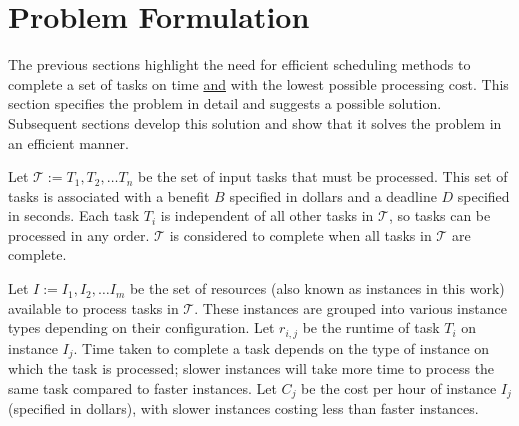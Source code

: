 \documentclass[12pt]{report}
\begin{document}

\section{Problem Formulation}

The previous sections highlight the need for efficient scheduling methods to complete a set of tasks on time \underline{and} with the lowest possible processing cost.
This section specifies the problem in detail and suggests a possible solution.
Subsequent sections develop this solution and show that it solves the problem in an efficient manner.

Let $\mathcal{T} := {T_1, T_2, \dots T_n}$ be the set of input tasks that must be processed.
This set of tasks is associated with a benefit $B$ specified in dollars and a deadline $D$ specified in seconds.
Each task $T_i$ is independent of all other tasks in $\mathcal{T}$, so tasks can be processed in any order.
$\mathcal{T}$ is considered to complete when all tasks in $\mathcal{T}$ are complete.

Let $I := {I_1, I_2, \dots I_m}$ be the set of resources (also known as instances in this work) available to process tasks in $\mathcal{T}$.
These instances are grouped into various instance types depending on their configuration.
Let $r_{i,j}$ be the runtime of task $T_i$ on instance $I_j$.
Time taken to complete a task depends on the type of instance on which the task is processed; slower instances will take more time to process the same task compared to faster instances.
Let $C_j$ be the cost per hour of instance $I_j$ (specified in dollars), with slower instances costing less than faster instances.
\end{document}
